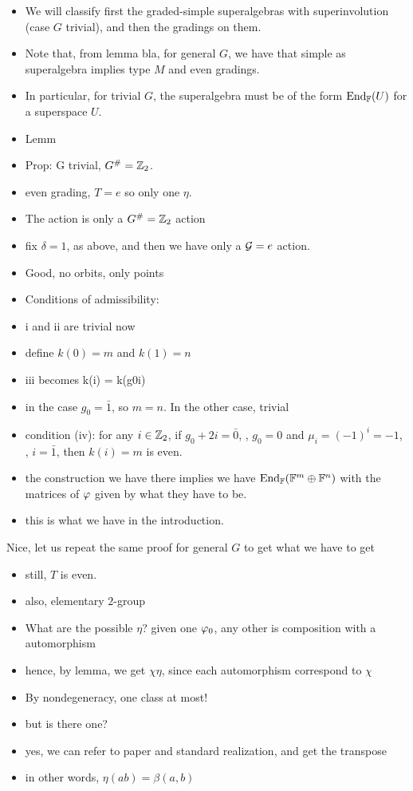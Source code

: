 \begin{itemize}
    \item We will classify first the graded-simple superalgebras with superinvolution (case $G$ trivial), and then the gradings on them.
    \item Note that, from lemma bla, for general $G$, we have that simple as superalgebra implies type $M$ and even gradings.
    \item In particular, for trivial $G$, the superalgebra must be of the form $\operatorname{End}_{\mathbb{F}} (U)$ for a superspace $U$.
    \item Lemm
    \item Prop: G trivial, $G^\# = \mathbb{Z}_2$.
    \item even grading, $T = e$ so only one $\eta$.
    \item The action is only a $G^\# = \mathbb{Z}_2$ action
    \item fix $\delta = 1$, as above, and then we have only a $\mathcal G = e$ action.
    \item Good, no orbits, only points
    \item Conditions of admissibility:
    \item i and ii are trivial now
    \item define $k(0) = m$ and $k(1) = n$
    \item iii becomes k(i) = k(g0i)
    \item in the case $g_0 = \bar 1$, so $m = n$. In the other case, trivial
    \item condition (iv): for any $i \in \mathbb{Z}_2$, if $g_0 + 2i = \bar 0$, \ie, $g_0 = 0$ and $\mu_i = (-1)^{i} = -1$, \ie, $i = \bar 1$, then $k(i) = m$ is even.
    \item the construction we have there implies we have $\operatorname{End}_{\mathbb{F}} (\mathbb{F}^m \oplus \mathbb{F}^n)$ with the matrices of $\varphi$ given by what they have to be.
    \item this is what we have in the introduction.
\end{itemize}

Nice, let us repeat the same proof for general $G$ to get what we have to get

\begin{itemize}
    \item still, $T$ is even.
    \item also, elementary $2$-group
    \item What are the possible $\eta$? given one $\varphi_0$, any other is composition with a automorphism
    \item hence, by lemma, we get $\chi \eta$, since each automorphism correspond to $\chi$
    \item By nondegeneracy, one class at most!
    \item but is there one?
    \item yes, we can refer to paper and standard realization, and get the transpose
    \item in other words, $\eta(ab) = \beta(a,b)$
\end{itemize}

